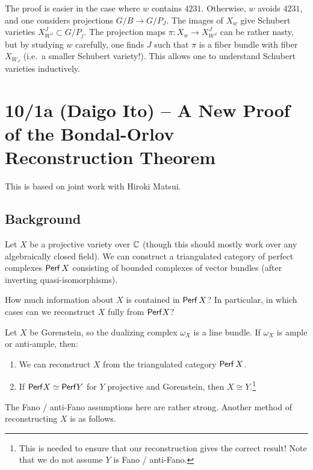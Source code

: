 \documentclass{amsart}
\begin{document}
The proof is easier in the case where $w$ contains $4231$.
Otherwise, $w$ avoids $4231$, and one considers projections $G/B \to G/P_J$.
The images of $X_w$ give Schubert varieties $X^J_{W^J} \subset G/P_j$.
The projection maps $\pi: X_w \to X^J_{W^J}$ can be rather nasty, but by studying $w$ carefully, one finds $J$ such that $\pi$ is a fiber bundle with fiber $X_{W_J}$ (i.e.\ a smaller Schubert variety!).
This allows one to understand Schubert varieties inductively.

\section{10/1a (Daigo Ito) -- A New Proof of the Bondal-Orlov Reconstruction Theorem}

This is based on joint work with Hiroki Matsui.

\subsection{Background}

Let $X$ be a projective variety over $\mathbb{C}$ (though this should mostly work over any algebraically closed field).
We can construct a triangulated category of perfect complexes $\mathsf{Perf}\, X$ consisting of bounded complexes of vector bundles (after inverting quasi-isomorphisms).

\begin{qn}
	How much information about $X$ is contained in $\mathsf{Perf}\, X$?
	In particular, in which cases can we reconstruct $X$ fully from $\mathsf{Perf} X$?
\end{qn}

\begin{thm}
	Let $X$ be Gorenstein, so the dualizing complex $\omega_X$ is a line bundle.
	If $\omega_X$ is ample or anti-ample, then:
	\begin{enumerate}
		\item We can reconstruct $X$ from the triangulated category $\mathsf{Perf}\, X$.
		\item If $\mathsf{Perf} X \simeq \mathsf{Perf} Y$ for $Y$ projective and Gorenstein, then $X \cong Y$.\footnote{This is needed to ensure that our reconstruction gives the correct result!
			Note that we do not assume $Y$ is Fano / anti-Fano.}
	\end{enumerate}
\end{thm}

The Fano / anti-Fano assumptions here are rather strong.
Another method of reconstructing $X$ is as follows.
\end{document}
